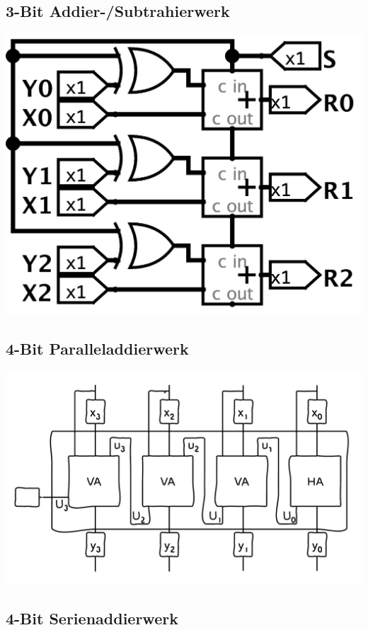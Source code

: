 \documentclass[a4paper,6pt]{article}
\begin{document}
\begin{multicols*}{3}
\subsection*{3-Bit Addier-/Subtrahierwerk}

\begin{center}
    \includegraphics[width=0.75\linewidth]{resources/3Bit-Addierwerk.png}
\end{center}

\subsection*{4-Bit Paralleladdierwerk}

\begin{center}
    \includegraphics[width=1\linewidth]{resources/4-Bit-Paralleladdierer.png}
\end{center}

\subsection*{4-Bit Serienaddierwerk}


\end{multicols*}
\end{document}
